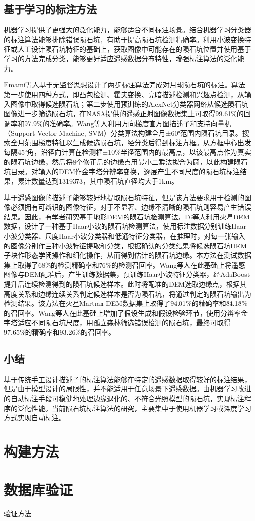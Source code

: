 \documentclass{article}
\begin{document}
\subsection{基于学习的标注方法}
机器学习提供了更强大的泛化能力，能够适合不同标注场景。结合机器学习分类器的标注算法能够排除错误陨石坑，有助于提高陨石坑检测精确率。利用小波变换特征或人工设计陨石坑特征的基础上，获取图像中可能存在的陨石坑位置并使用基于学习的方法完成分类，能够更好适应遥感数据分布特性，增强标注算法的泛化能力。\par
Emami\cite{emamiCraterDetectionUsing2019}等人基于无监督思想设计了两步标注算法完成对月球陨石坑的标注。算法第一步使用四种方式，即凸包检测、霍夫变换、亮暗描述检测和兴趣点检测，从输入图像中取得候选陨石坑；第二步使用预训练的AlexNet分类器网络从候选陨石坑图像进一步筛选陨石坑，在NASA提供的遥感正射图像数据集上可取得99.61\%的回调率和97.9\%的准确率。Wang\cite{wangImprovedGlobalCatalog2021}等人利用方向梯度直方图描述子和支持向量机（Support Vector Machine, SVM）分类算法构建全月±60°范围内陨石坑目录。搜索全月范围梯度特征以生成候选陨石坑，经分类后得到标注方框。从方框中心出发每隔45°角，沿径向计算在检测框±10\%半径范围内的最高点，以该最高点作为真实的陨石坑边缘，然后将8个修正后的边缘点用最小二乘法拟合为圆，以此构建陨石坑目录。对输入的DEM作金字塔分辨率变换，逐层产生不同尺度的陨石坑标注结果，累计数量达到1319373，其中陨石坑直径均大于1km。\par
基于遥感图像的描述子能够较好地提取陨石坑特征，但是该方法要求用于检测的图像必须拥有可辨识的图像特征，对于不显著、边缘不清晰的陨石坑则容易产生错误结果。因此，有学者研究基于地形DEM的陨石坑检测算法。Di\cite{diMachineLearningApproach2014}等人利用火星DEM数据，设计了一种基于Haar小波的陨石坑检测算法，使用标注数据分别训练Haar小波分类器、尺度Haar小波分类器和低通特征分类器，在推理时，对每一张输入的图像分别作三种小波特征提取和分类，根据确认的分类结果将候选陨石坑DEM子块作形态学闭操作和细化操作，从而得到估计的陨石坑边缘。本方法在测试数据集上取得了68\%的检测精确率和76\%的检测召回率。Wang\cite{wangActiveMachineLearning2019}等人在此基础上将遥感图像与DEM配准后，产生训练数据集，预训练Haar小波特征分类器，经AdaBoost提升后连续检测得到的陨石坑候选样本。此时将配准的DEM选取边缘点，根据其高度关系和边缘连续关系判定候选样本是否为陨石坑，将通过判定的陨石坑输出为检测结果。该方法在火星Martian DEM数据集上取得了94.01\%的精确率和84.18\%的召回率。Wang\cite{wangNovelApproachMultiscale2022}等人在此基础上增加了假设生成和假设检验环节，使用分辨率金字塔适应不同陨石坑尺度，用孤立森林筛选错误检测的陨石坑，最终可取得97.65\%的精确率和93.26\%的召回率。
\subsection{小结}
基于传统手工设计描述子的标注算法能够在特定的遥感数据取得较好的标注结果，但是由于模型设计的局限性，并不能适用于任意场景下遥感数据。由机器学习改进的自动标注手段可稳健地处理边缘退化的、不符合光照模型的陨石坑，实现标注程序的泛化性能。当前陨石坑标注算法的研究，主要集中于使用机器学习或深度学习方式实现自动标注。
\section{构建方法}
\section{数据库验证}
验证方法
\newpage
\printbibliography[heading=bibliography,title=参考文献]
\end{document}
